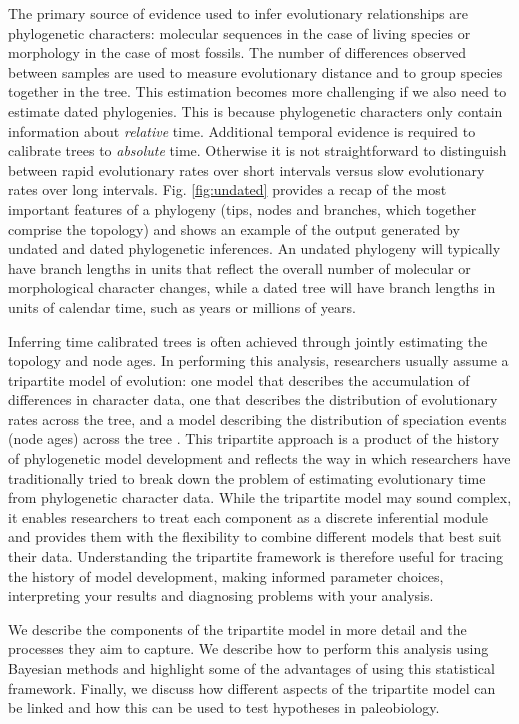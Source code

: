 \documentclass[11pt]{article}
\begin{document}
The primary source of evidence used to infer evolutionary relationships are phylogenetic characters: molecular sequences in the case of living species or morphology in the case of most fossils. 
The number of differences observed between samples are used to measure evolutionary distance and to group species together in the tree.
This estimation becomes more challenging if we also need to estimate dated phylogenies.
This is because phylogenetic characters only contain information about \textit{relative} time. 
Additional temporal evidence is required to calibrate trees to \textit{absolute} time.
Otherwise it is not straightforward to distinguish between rapid evolutionary rates over short intervals versus slow evolutionary rates over long intervals.
Fig. \ref{fig:undated} provides a recap of the most important features of a phylogeny (tips, nodes and branches, which together comprise the topology) and shows an example of the output generated by undated and dated phylogenetic inferences. 
An undated phylogeny will typically have branch lengths in units that reflect the overall number of molecular or morphological character changes, while a dated tree will have branch lengths in units of calendar time, such as years or millions of years.

Inferring time calibrated trees is often achieved through jointly estimating the topology and node ages.
In performing this analysis, researchers usually assume a tripartite model of evolution: one model that describes the accumulation of differences in character data, one that describes the distribution of evolutionary rates across the tree, and a model describing the distribution of speciation events (node ages) across the tree \cite{Thorne1998,Kishino2001,Yang2006,Drummond2006}.
This tripartite approach is a product of the history of phylogenetic model development and reflects the way in which researchers have traditionally tried to break down the problem of estimating evolutionary time from phylogenetic character data.
While the tripartite model may sound complex, it enables researchers to treat each component as a discrete inferential module and provides them with the flexibility to combine different models that best suit their data.
Understanding the tripartite framework is therefore useful for tracing the history of model development, making informed parameter choices, interpreting your results and diagnosing problems with your analysis.

We describe the components of the tripartite model in more detail and the processes they aim to capture.
We describe how to perform this analysis using Bayesian methods and highlight some of the advantages of using this statistical framework.
Finally, we discuss how different aspects of the tripartite model can be linked and how this can be used to test hypotheses in paleobiology.
\end{document}
